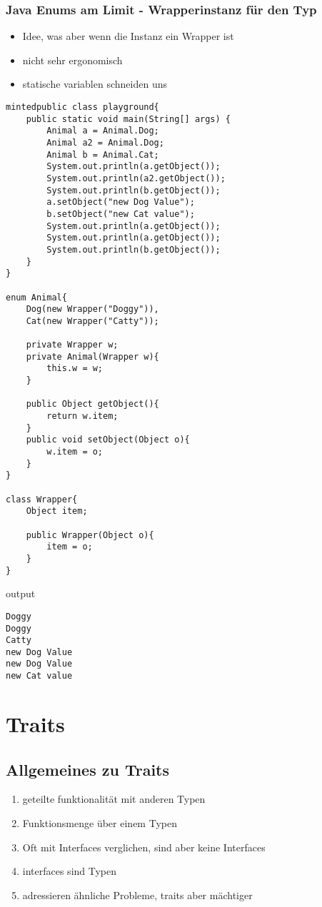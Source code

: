 \documentclass[a4paper, 1ppt]{article}
\begin{document}
\subsubsection{Java Enums am Limit - Wrapperinstanz für den Typ}
\begin{itemize}
	\item Idee, was aber wenn die Instanz ein Wrapper ist
	\item nicht sehr ergonomisch 
	\item statische variablen schneiden uns 
\end{itemize}
\begin{verbatim}
mintedpublic class playground{
	public static void main(String[] args) {
		Animal a = Animal.Dog;
		Animal a2 = Animal.Dog;
		Animal b = Animal.Cat;
		System.out.println(a.getObject());
		System.out.println(a2.getObject());
		System.out.println(b.getObject());
		a.setObject("new Dog Value");
		b.setObject("new Cat value");
		System.out.println(a.getObject());
		System.out.println(a.getObject());
		System.out.println(b.getObject());
	}
}

enum Animal{
	Dog(new Wrapper("Doggy")),
	Cat(new Wrapper("Catty"));

	private Wrapper w;
	private Animal(Wrapper w){
		this.w = w;
	}

	public Object getObject(){
		return w.item;
	}
	public void setObject(Object o){
		w.item = o;
	}
}

class Wrapper{
	Object item;

	public Wrapper(Object o){
		item = o;
	}
}
\end{verbatim}
output
\begin{verbatim}
Doggy
Doggy
Catty
new Dog Value
new Dog Value
new Cat value
\end{verbatim}
\section{Traits}
\subsection{Allgemeines zu Traits}
\begin{enumerate}
	\item geteilte funktionalität mit anderen Typen
	\item Funktionsmenge über einem Typen
	\item Oft mit Interfaces verglichen, sind aber keine Interfaces
	\item interfaces sind Typen
	\item adressieren ähnliche Probleme, traits aber mächtiger
\end{enumerate}
\end{document}
